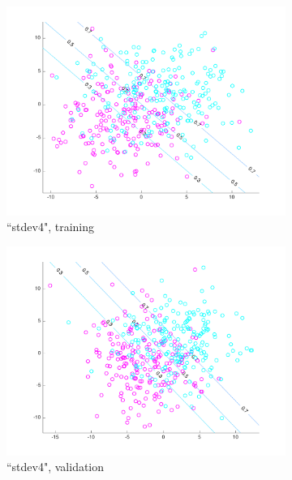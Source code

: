 \begin{figure}[h!]
    \begin{subfigure}[b]{0.22\textwidth}
	\includegraphics[scale=0.25]{hw2_1_stdev4_a_0.pdf}
	\caption{``stdev4", training}\label{fig:data_stdev4a}
    \end{subfigure}  
    \quad
    \begin{subfigure}[b]{0.22\textwidth}
	\includegraphics[scale=0.25]{hw2_1_stdev4_b_0.pdf}
	\caption{``stdev4", validation}\label{fig:data_stdev4b}
    \end{subfigure}  
    \begin{subfigure}[b]{0.22\textwidth}

\end{subfigure}
\end{figure}
